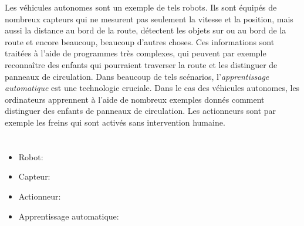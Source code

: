 {{Les véhicules autonomes sont un exemple de tels robots. Ils sont équipés de nombreux capteurs qui ne mesurent pas seulement la vitesse et la position, mais aussi la distance au bord de la route, détectent les objets sur ou au bord de la route et encore beaucoup, beaucoup d’autres choses. Ces informations sont traitées à l’aide de programmes très complexes, qui peuvent par exemple reconnaître des enfants qui pourraient traverser la route et les distinguer de panneaux de circulation. Dans beaucoup de tels scénarios, l’\emph{apprentissage automatique} est une technologie cruciale. Dans le cas des véhicules autonomes, les ordinateurs apprennent à l’aide de nombreux exemples donnés comment distinguer des enfants de panneaux de circulation. Les actionneurs sont par exemple les freins qui sont activés sans intervention humaine.



\section*{\BrochureWebsitesAndKeywords}
{\raggedright
\begin{itemize}
  \item Robot: \href{https://fr.wikipedia.org/wiki/Robot}{}
  \item Capteur: \href{https://fr.wikipedia.org/wiki/Capteur}{}
  \item Actionneur: \href{https://fr.wikipedia.org/wiki/Actionneur}{}
  \item Apprentissage automatique: \href{https://fr.wikipedia.org/wiki/Apprentissage_automatique}{}
\end{itemize}


}

}{}

\def\AuthorWeigendM{} %
\def\AuthorAlmajhadE{} %
\def\AuthorBergsveinsdottirL{} %
\def\AuthorLacherR{} %
\def\AuthorWeigendM{} %
\def\AuthorDatzkoS{} %
\def\AuthorPelletE{} %

\newpage}{}
